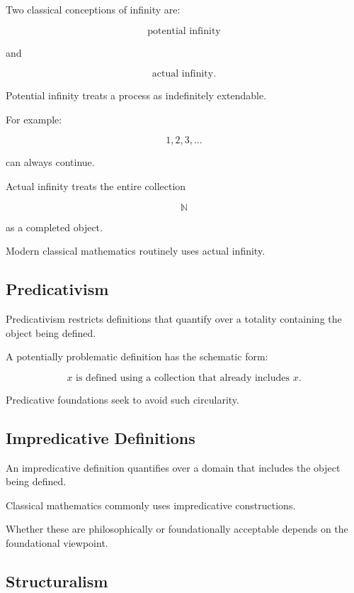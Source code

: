 Two classical conceptions of infinity are:

\[
\boxed{
\text{potential infinity}
}
\]

and

\[
\boxed{
\text{actual infinity}.
}
\]

Potential infinity treats a process as indefinitely extendable.

For example:

\[
1,2,3,\ldots
\]

can always continue.

Actual infinity treats the entire collection

\[
\boxed{
\mathbb{N}
}
\]

as a completed object.

Modern classical mathematics routinely uses actual infinity.

\subsection{Predicativism}
\label{subsec:predicativism}

Predicativism restricts definitions that quantify over a totality containing
the object being defined.

A potentially problematic definition has the schematic form:

\[
\boxed{
x
\text{ is defined using a collection that already includes }x.
}
\]

Predicative foundations seek to avoid such circularity.

\subsection{Impredicative Definitions}
\label{subsec:impredicative-definitions}

An impredicative definition quantifies over a domain that includes the
object being defined.

Classical mathematics commonly uses impredicative constructions.

Whether these are philosophically or foundationally acceptable depends on
the foundational viewpoint.

\subsection{Structuralism}
\label{subsec:mathematical-structuralism}

